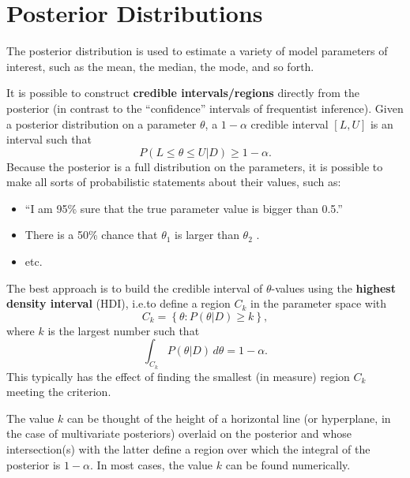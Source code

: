 \section{Posterior Distributions}
The posterior distribution is used to estimate a variety of model parameters of interest, such as the mean, the median, the mode, and so forth. \par It is possible to construct \textbf{credible intervals/regions} directly from the posterior (in contrast to the ``confidence'' intervals of frequentist inference). 
\newl Given a posterior distribution on a parameter $\theta$, a $1-\alpha$ credible interval $[L,U]$ is an interval such that
$$ P(L \leq \theta \leq U|D)\geq 1-\alpha.$$
Because the posterior is a full distribution on the parameters, it is possible to make all sorts of probabilistic statements about their values, such as:
\begin{itemize}[noitemsep]
	\item ``I am 95\% sure that the true parameter value is bigger than 0.5.''
	\item There is a 50\% chance that  $\theta_{1}$ is larger than $\theta_{2}$  .
  \item etc.
\end{itemize}
The best approach is to build the credible interval of $\theta$-values using the \textbf{highest density interval} (HDI), i.e.\@ to define a region $C_k$ in the parameter space with 
$$ C_k = \left\{\theta: P(\theta|D)\geq k\right\},$$
where $k$ is the largest number such that
$$ \int_{C_k} P(\theta|D)\, d\theta = 1-\alpha.$$
This typically has the effect of finding the smallest (in measure) region $C_k$ meeting the criterion.\par The value $k$ can be thought of the height of a horizontal line (or hyperplane, in the case of multivariate posteriors) overlaid on the  posterior and whose intersection(s) with the latter define a region over which the integral of the posterior is $1-\alpha$. In most cases, the value $k$ can be found numerically. 


